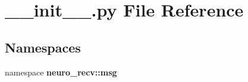\section{\-\_\-\-\_\-init\-\_\-\-\_\-.\-py \-File \-Reference}
\label{msg_2____init_____8py}
\subsection*{\-Namespaces}
\begin{DoxyCompactItemize}
\item 
namespace {\bf neuro\-\_\-recv\-::msg}
\end{DoxyCompactItemize}
